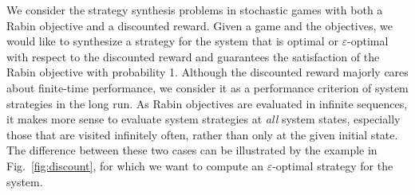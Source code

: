 \documentclass[runningheads,a4paper]{llncs}
\begin{document}
We consider the strategy synthesis problems in stochastic games with both a Rabin objective and a discounted reward. Given a game and the objectives, we would like to synthesize a strategy for the system that is optimal or $\varepsilon$-optimal with respect to the discounted reward and guarantees the satisfaction of the Rabin objective with probability 1. Although the discounted reward majorly cares about finite-time performance, we consider it as a performance criterion of system strategies in the long run. As Rabin objectives are evaluated in infinite sequences, it makes more sense to evaluate system strategies at \emph{all} system states, especially those that are visited infinitely often, rather than only at the given initial state. The difference between these two cases can be illustrated by the example in Fig.~\ref{fig:discount}, for which we want to compute an $\varepsilon$-optimal strategy for the system. 
\iffalse
\begin{wrapfigure}{r}{6cm}\centering
\begin{tikzpicture}[->,>=stealth',shorten >=1pt,auto,node distance=2.8cm,
                    semithick]
  \tikzstyle{every state}=[draw=black,text=black]

  \node[initial,state,rectangle] (q0)                  {$q_0$};
  \node[state]         			(q1) [right of=q0]    {$q_1$};

  \path (q0)    edge [loop above]   node                {$(a_0, 0.999, 0)$} (q0)
                edge [bend left]    node[shift={(0,0)}] {$(a_0, 0.001, 0)$} (q1)
        (q1)    edge [loop above]   node[shift={(0,0)}] {$(a_1, 1, 1)$} (q1)
        		    edge [bend left]    node[shift={(0,0)}] {$(a_2, 1, 0)$} (q0);
\end{tikzpicture}
\caption{A stochastic game with Rabin pairs $\{(\emptyset, \{q_0\})\}$. $q_0$ is an environment state and $q_1$ is a system state. When the environment takes $a_0$ at $q_0$, the state transits to $q_1$ with probability 0.001 and does a self loop with probability 0.999. The reward is 0 in both cases. If the system takes $a_1$ at $q_1$, it does a self loop with probability 1 and the reward is 1; if it takes $a_2$ at $q_1$, the state transits back to $q_0$ with probability 1 and reward 0. }
\end{wrapfigure}
\fi
\end{document}
